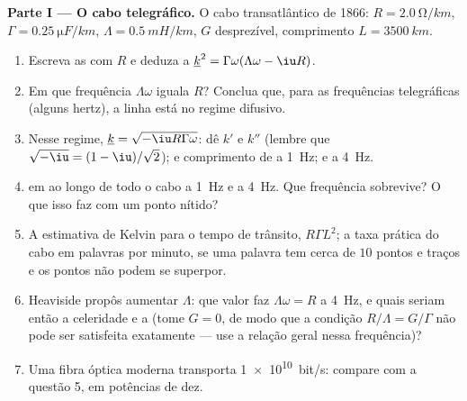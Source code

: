 \begin{problem}
\label{pb:b2:dispersion-wave-packets:1}

\medskip
\noindent\textbf{Parte I --- O cabo telegráfico.}
O cabo transatlântico de 1866: $R = \qty{2.0}{\ohm/km}$, $\Gamma = \qty{0.25}{\micro F/km}$,
$\Lambda = \qty{0.5}{mH/km}$, $G$ desprezível, comprimento $L = \qty{3500}{km}$.
\begin{enumerate}
  \item Escreva as  com $R$ e deduza a
         $\underline k^2 = \Gamma\omega(\Lambda\omega - \iu R)$.
  \item Em que frequência $\Lambda\omega$ iguala $R$? Conclua que, para as
        frequências telegráficas (alguns hertz), a linha está no
        regime difusivo.
  \item Nesse regime, $\underline k = \sqrt{-\iu R\Gamma\omega}$: dê $k'$ e $k''$
        (lembre que $\sqrt{-\iu} = (1 - \iu)/\sqrt2$);  e
        comprimento de  a \qty{1}{Hz}; e a \qty{4}{Hz}.
  \item {} em  ao longo de todo o cabo a \qty{1}{Hz} e
        a \qty{4}{Hz}. Que frequência sobrevive? O que isso faz com um
        ponto nítido?
  \item A estimativa de Kelvin para o tempo de trânsito, $R\Gamma L^2$; a taxa
        prática do cabo em palavras por minuto, se uma palavra tem cerca de
        $10$ pontos e traços e os pontos não podem se superpor.
  \item Heaviside propôs aumentar $\Lambda$: que valor faz $\Lambda\omega = R$
        a \qty{4}{Hz}, e quais seriam então a celeridade e a 
        (tome $G = 0$, de modo que a condição $R/\Lambda = G/\Gamma$ não pode ser
        satisfeita exatamente --- use a relação geral nessa frequência)?
  \item Uma fibra óptica moderna transporta \qty{1e10}{bit/s}: compare com a
        questão 5, em potências de dez.
\end{enumerate}


\end{problem}
